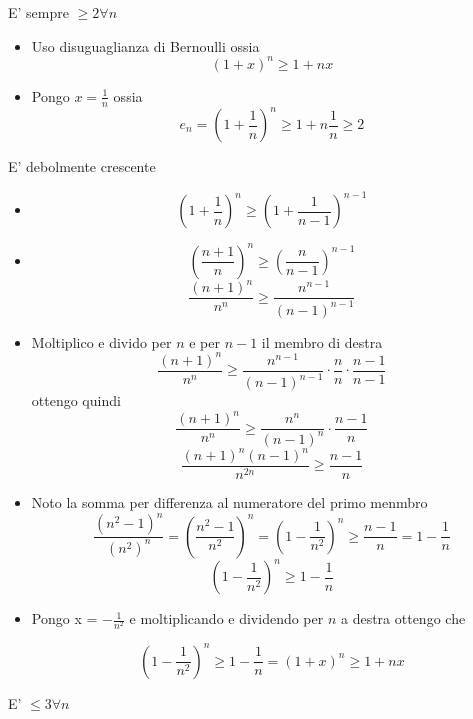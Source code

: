 E' sempre $\ge 2 \forall n$
\begin{itemize}
	\item Uso disuguaglianza di Bernoulli ossia
	      \[
		      \left( 1+x \right) ^{n} \ge 1+ nx
	      \]
	\item Pongo $x=\frac{1}{n}$ ossia
	      \[
		      e_n = \left( 1+\frac{1}{n} \right) ^{n} \ge 1 + n \frac{1}{n} \ge 2
	      \]
\end{itemize}
E' debolmente crescente
\begin{itemize}
	\item \[
		      \left( 1+\frac{1}{n} \right)^{n} \ge \left( 1 + \frac{1}{n-1} \right) ^{n-1}
	      \]
	\item \[
		      \left( \frac{n+1}{n} \right) ^{n} \ge \left( \frac{n}{n-1} \right) ^{n-1}
	      \]
	      \[
		      \frac{\left( n+1 \right) ^{n}}{n^{n}} \ge \frac{n^{n-1}}{\left( n-1 \right) ^{n-1}}
	      \]
	\item Moltiplico e divido per $n$ e per $n-1$ il membro di destra
	      \[
		      \frac{\left( n+1 \right) ^{n}}{n^{n}} \ge \frac{n^{n-1}}{\left( n-1 \right) ^{n-1}} \cdot \frac{n}{n} \cdot \frac{n-1}{n-1}
	      \]
	      ottengo quindi
	      \[
		      \frac{\left( n+1 \right) ^{n}}{n^{n}}\ge \frac{n^{n}}{\left( n-1 \right) ^{n}}\cdot \frac{n-1}{n}
	      \]
	      \[
		      \frac{\left( n+1 \right) ^{n} \left( n-1 \right) ^{n}}{n^{2n}} \ge \frac{n-1}{n}
	      \]
	\item Noto la somma per differenza al numeratore del primo menmbro
	      \[
		      \frac{\left( n^2-1 \right) ^{n}}{\left( n^2 \right) ^{n}} = \left( \frac{n^2-1}{n^2} \right) ^{n} = \left( 1 - \frac{1}{n^{2}} \right)^{n}\ge \frac{n-1}{n} = 1 - \frac{1}{n}
	      \]
	      \[
		      \left( 1 - \frac{1}{n^{2}} \right)^{n} \ge   1 - \frac{1}{n}
	      \]
	\item Pongo x = $-\frac{1}{n^2}$ e moltiplicando e dividendo per $n$ a destra ottengo che

	      \[
		      \left( 1-\frac{1}{n^2} \right) ^{n} \ge 1- \frac{1}{n} = \left( 1+x \right) ^{n} \ge 1+ nx
	      \]
\end{itemize}
E' $\le 3 \forall n$
